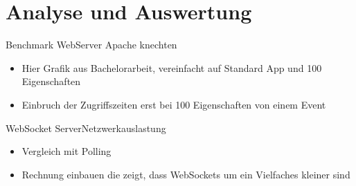 \section{Analyse und Auswertung}

\begin{frame}{Benchmark WebServer}
	Apache knechten
	\begin{itemize}
		\item Hier Grafik aus Bachelorarbeit, vereinfacht auf Standard App und 100 Eigenschaften
		\item Einbruch der Zugriffszeiten erst bei 100 Eigenschaften von einem Event
	\end{itemize}
\end{frame}

\begin{frame}{WebSocket Server}{Netzwerkauslastung}
	\begin{itemize}
		\item Vergleich mit Polling
		\item Rechnung einbauen die zeigt, dass WebSockets um ein Vielfaches kleiner sind
	\end{itemize}
\end{frame}